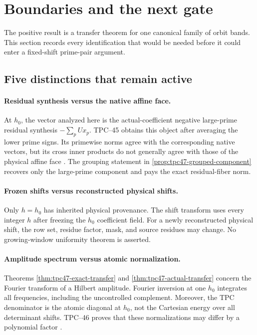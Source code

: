 \section{Boundaries and the next gate}
\label{sec:tpc47-boundaries}

The positive result is a transfer theorem for one canonical family of
orbit bands.  This section records every identification that would be
needed before it could enter a fixed-shift prime-pair argument.

\subsection{Five distinctions that remain active}

\paragraph{Residual synthesis versus the native affine face.}
At \(h_0\), the vector analyzed here is the actual-coefficient
negative large-prime residual synthesis \(-\sum_pUx_p\).  TPC--45 obtains this
object after averaging the lower prime signs.  Its primewise norms agree
with the corresponding native vectors, but its cross inner products do
not generally agree with those of the physical affine face
\citep{WangTPC45}.  The grouping statement in
\cref{prop:tpc47-grouped-component} recovers only the large-prime
component and pays the exact residual-fiber norm.

\paragraph{Frozen shifts versus reconstructed physical shifts.}
Only \(h=h_0\) has inherited physical provenance.  The shift transform
uses every integer \(h\) after freezing the \(h_0\) coefficient field.
For a newly reconstructed physical shift, the row set, residue factor,
mask, and source residues may change.  No growing-window uniformity
theorem is asserted.

\paragraph{Amplitude spectrum versus atomic normalization.}
Theorems \ref{thm:tpc47-exact-transfer} and
\ref{thm:tpc47-actual-transfer} concern the Fourier transform of a
Hilbert amplitude.  Fourier inversion at one \(h_0\) integrates all
frequencies, including the uncontrolled complement.  Moreover, the
TPC denominator is the atomic diagonal at \(h_0\), not the Cartesian
energy over all determinant shifts.  TPC--46 proves that these
normalizations may differ by a polynomial factor \citep{WangTPC46}.

